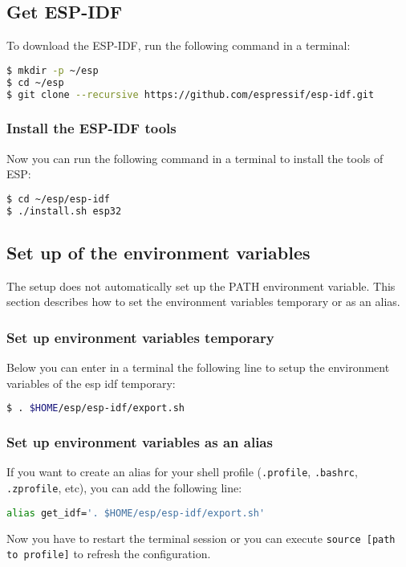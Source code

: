 \subsection{Get ESP-IDF}
To download the ESP-IDF, run the following command in a terminal:
\begin{lstlisting}[language=bash]
$ mkdir -p ~/esp
$ cd ~/esp
$ git clone --recursive https://github.com/espressif/esp-idf.git
\end{lstlisting}\cite{EspressifGetStartedGetESPIDF}

\subsubsection{Install the ESP-IDF tools}
Now you can run the following command in a terminal to install the tools of ESP:
\begin{lstlisting}[language=bash]
$ cd ~/esp/esp-idf
$ ./install.sh esp32
\end{lstlisting}\cite{EspressifGetStartedsetUpTheTools}

\subsection{Set up of the environment variables}
The setup does not automatically set up the PATH environment variable. This section describes
how to set the environment variables temporary or as an alias. 

\subsubsection{Set up environment variables temporary}
Below you can enter in a terminal the following line to setup the environment variables of the esp idf temporary:
\begin{lstlisting}[language=bash]
$ . $HOME/esp/esp-idf/export.sh
\end{lstlisting} 

\cite{EspressifGetStartedsetUpTheEnvironmentVariables}

\subsubsection{Set up environment variables as an alias}\label{environment_variable}
If you want to create an alias for your shell profile (\texttt{.profile}, \texttt{.bashrc}, \texttt{.zprofile}, etc), you can add the following line:
\begin{lstlisting}[language=bash]
alias get_idf='. $HOME/esp/esp-idf/export.sh'
\end{lstlisting}

Now you have to restart the terminal session or you can execute \texttt{source  [path to profile]} to refresh the configuration.\cite{EspressifGetStartedsetUpTheEnvironmentVariables}

